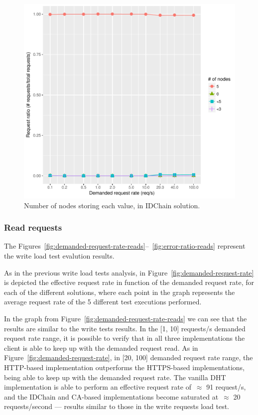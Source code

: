\begin{figure}[H]
  \centering
  \includegraphics[scale=0.4]{Figures/evaluation/stored-ratio-https-bc.pdf}
  \caption{Number of nodes storing each value, in IDChain solution.}
\label{fig:stored-ratio-https-bc}
\end{figure}

\subsubsection{Read requests}

The Figures~\ref{fig:demanded-request-rate-reads}–~\ref{fig:error-ratio-reads} represent the write load test evalution results.

As in the previous write load tests analysis, in Figure~\ref{fig:demanded-request-rate} is depicted the effective request rate in function of the demanded request rate, for each of the different solutions, where each point in the graph represents the average request rate of the 5 different test executions performed.

In the graph from Figure~\ref{fig:demanded-request-rate-reads} we can see that the results are similar to the write tests results.
In the [1, 10] requests/s demanded request rate range, it is possible to verify that in all three implementations the client is able to keep up with the demanded request read.
As in Figure~\ref{fig:demanded-request-rate}, in [20, 100] demanded request rate range, the HTTP-based implementation outperforms the HTTPS-based implementations, being able to keep up with the demanded request rate.
The vanilla DHT implementation is able to perform an effective request rate of~$\approx$ 91 request/s, and the IDChain and CA-based implementations become saturated at~$\approx$ 20 requests/second — results similar to those in the write requests load test.

